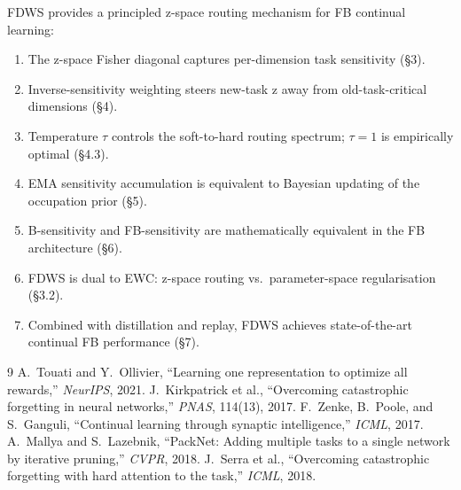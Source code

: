 \documentclass[11pt]{article}
\begin{document}
FDWS provides a principled z-space routing mechanism for FB continual learning:
\begin{enumerate}[nosep]
    \item The z-space Fisher diagonal captures per-dimension task sensitivity (\S3).
    \item Inverse-sensitivity weighting steers new-task z away from old-task-critical dimensions (\S4).
    \item Temperature $\tau$ controls the soft-to-hard routing spectrum; $\tau = 1$ is empirically optimal (\S4.3).
    \item EMA sensitivity accumulation is equivalent to Bayesian updating of the occupation prior (\S5).
    \item B-sensitivity and FB-sensitivity are mathematically equivalent in the FB architecture (\S6).
    \item FDWS is dual to EWC: z-space routing vs.\ parameter-space regularisation (\S3.2).
    \item Combined with distillation and replay, FDWS achieves state-of-the-art continual FB performance (\S7).
\end{enumerate}

\begin{thebibliography}{9}
 A.~Touati and Y.~Ollivier, ``Learning one representation to optimize all rewards,'' \textit{NeurIPS}, 2021.
 J.~Kirkpatrick et al., ``Overcoming catastrophic forgetting in neural networks,'' \textit{PNAS}, 114(13), 2017.
 F.~Zenke, B.~Poole, and S.~Ganguli, ``Continual learning through synaptic intelligence,'' \textit{ICML}, 2017.
 A.~Mallya and S.~Lazebnik, ``PackNet: Adding multiple tasks to a single network by iterative pruning,'' \textit{CVPR}, 2018.
 J.~Serra et al., ``Overcoming catastrophic forgetting with hard attention to the task,'' \textit{ICML}, 2018.
\end{thebibliography}
\end{document}
